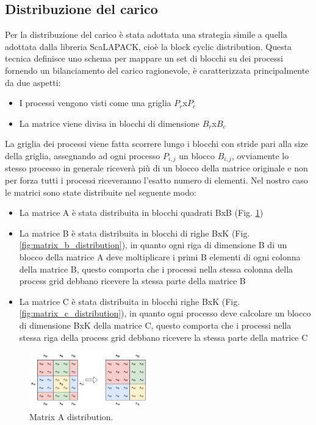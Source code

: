\documentclass[conference]{IEEEtran}
\begin{document}
\subsection{Distribuzione del carico}
Per la distribuzione del carico è stata adottata una strategia simile a quella adottata dalla libreria ScaLAPACK, cioè la block cyclic distribution. Questa tecnica definisce uno schema per mappare un set di blocchi su dei processi fornendo un bilanciamento del carico ragionevole, è caratterizzata principalmente da due aspetti:
\begin{itemize}
    \item I processi vengono visti come una griglia $P_r$x$P_c$
    \item La matrice viene divisa in blocchi di dimensione $B_r$x$B_c$
\end{itemize}
La griglia dei processi viene fatta scorrere lungo i blocchi con stride pari alla size della griglia, assegnando ad ogni processo $P_{i,j}$ un blocco $B_{i,j}$, ovviamente lo stesso processo in generale riceverà più di un blocco della matrice originale e non per forza tutti i processi riceveranno l'esatto numero di elementi.
Nel nostro caso le matrici sono state distribuite nel seguente modo:
\begin{itemize}
    \item La matrice A è stata distribuita in blocchi quadrati BxB (Fig. \ref{fig:matrix_a_distribution})
    \item La matrice B è stata distribuita in blocchi di righe BxK (Fig. \ref{fig:matrix_b_distribution}), in quanto ogni riga di dimensione B di un blocco della matrice A deve moltiplicare i primi B elementi di ogni colonna della matrice B, questo comporta che i processi nella stessa colonna della process grid debbano ricevere la stessa parte della matrice B
    \item La matrice C è stata distribuita in blocchi righe BxK (Fig. \ref{fig:matrix_c_distribution}), in quanto ogni processo deve calcolare un blocco di dimensione BxK della matrice C, questo comporta che i processi nella stessa riga della process grid debbano ricevere la stessa parte della matrice C
\end{itemize} 
\begin{figure}[H]
    \raggedright
    \includegraphics[width=0.45\textwidth]{resources/matrixA_2d_block_cyclic_distribution.jpg}
    \caption{Matrix A distribution.}
    \label{fig:matrix_a_distribution}
\end{figure}
\end{document}
